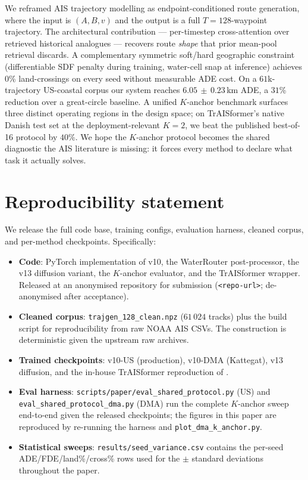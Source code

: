 \documentclass[11pt]{article}
\begin{document}
We reframed AIS trajectory modelling as endpoint-conditioned route
generation, where the input is $(A, B, v)$ and the output is a full
$T{=}128$-waypoint trajectory. The architectural contribution ---
per-timestep cross-attention over retrieved historical analogues ---
recovers route \emph{shape} that prior mean-pool retrieval discards.
A complementary symmetric soft/hard geographic constraint
(differentiable SDF penalty during training, water-cell snap at
inference) achieves $0$\% land-crossings on every seed without measurable
ADE cost. On a $61$k-trajectory US-coastal corpus our system reaches
$6.05\,\pm\,0.23$\,km ADE, a $31$\% reduction over a great-circle
baseline. A unified $K$-anchor benchmark surfaces three distinct
operating regions in the design space; on TrAISformer's native Danish
test set at the deployment-relevant $K{=}2$, we beat the published
best-of-16 protocol by $40$\%. We hope the $K$-anchor protocol becomes
the shared diagnostic the AIS literature is missing: it forces every
method to declare what task it actually solves.

\section*{Reproducibility statement}
\label{sec:reproducibility}

We release the full code base, training configs, evaluation harness,
cleaned corpus, and per-method checkpoints. Specifically:

\begin{itemize}[leftmargin=*,topsep=2pt,itemsep=0pt]
\item \textbf{Code}: PyTorch implementation of v10, the WaterRouter
      post-processor, the v13 diffusion variant, the $K$-anchor
      evaluator, and the TrAISformer wrapper. Released at an anonymised
      repository for submission (\texttt{<repo-url>}; de-anonymised
      after acceptance).
\item \textbf{Cleaned corpus}: \texttt{trajgen\_128\_clean.npz}
      ($61\,024$ tracks) plus the build script for reproducibility
      from raw NOAA AIS CSVs. The construction is deterministic given
      the upstream raw archives.
\item \textbf{Trained checkpoints}: v10-US (production),
      v10-DMA (Kattegat), v13 diffusion, and the in-house TrAISformer
      reproduction of \citet{traisformer2024}.
\item \textbf{Eval harness}: \texttt{scripts/paper/eval\_shared\_protocol.py}
      (US) and \texttt{eval\_shared\_protocol\_dma.py} (DMA) run the
      complete $K$-anchor sweep end-to-end given the released
      checkpoints; the figures in this paper are reproduced by re-running
      the harness and \texttt{plot\_dma\_k\_anchor.py}.
\item \textbf{Statistical sweeps}: \texttt{results/seed\_variance.csv}
      contains the per-seed ADE/FDE/land\%/cross\% rows used for the
      $\pm$ standard deviations throughout the paper.
\end{itemize}
\end{document}
